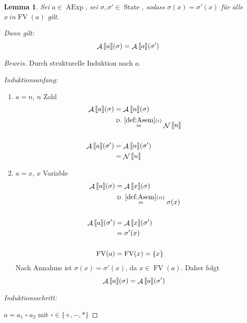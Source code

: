 \documentclass[a4paper,12pt]{article}
\theoremstyle{definition}
\theoremstyle{plain}
\newtheorem{lemma}[definition]{Lemma}
\theoremstyle{remark}
\newcommand{\lsem}{\mathrm{[}\kern-.14em\mathrm{[}}
\newcommand{\rsem}{\mathrm{]}\kern-.14em\mathrm{]}}
\newcommand{\defrefshort}[1]{\text{D.}~\ref{#1}}  %
\DeclareMathOperator{\AExp}{AExp}
\DeclareMathOperator{\State}{State}
\DeclareMathOperator{\A}{\mathcal{A}}
\DeclareMathOperator{\N}{\mathcal{N}}
\DeclareMathOperator{\FV}{FV}
\begin{document}
\begin{lemma}
    Sei $a \in \AExp$, sei $\sigma, \sigma' \in \State$, sodass $\sigma(x) = \sigma'(x)$ für alle $x \ in\FV(a)$ gilt.

    Dann gilt: $$\A\lsem a \rsem(\sigma) = \A\lsem a \rsem(\sigma')$$
\end{lemma}
\begin{proof}[Beweis]
    Durch strukturelle Induktion nach $a$.

    \emph{Induktionsanfang:}
    \begin{enumerate}
        \item $a = n$, $n$ Zahl
            \begin{align*}
                \A\lsem a \rsem(\sigma) & = \A\lsem n \rsem(\sigma) \\
                & \overset{\defrefshort{def:Asem}(i)}{=} \N\lsem n \rsem \\
                \\
                \A\lsem a \rsem(\sigma') & = \A\lsem n \rsem(\sigma') \\
                & = \N\lsem n \rsem
            \end{align*}

        \item $a = x$, $x$ Variable
            \begin{align*}
                \A\lsem a \rsem(\sigma) & = \A\lsem x \rsem(\sigma) \\
                & \overset{\defrefshort{def:Asem}(ii)}{=} \sigma(x) \\
                \\
                \A\lsem a \rsem(\sigma') & = \A\lsem x \rsem(\sigma') \\
                & = \sigma'(x) \\
                \\
                \FV(a) & = \FV(x) = \{ x \}
            \end{align*}
            Nach Annahme ist $\sigma(x) = \sigma'(x)$, da $x \in \FV(a)$. Daher folgt
            $$\A\lsem a \rsem(\sigma) = \A\lsem a \rsem(\sigma')$$
    \end{enumerate}

    \emph{Induktionsschritt:}

    $a = a_1 \;\square\; a_2$ mit $\square \in \{ +, -, * \}$


\end{proof}
\end{document}
